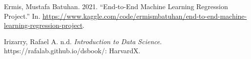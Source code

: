 \documentclass[
]{article}
\newlength{\cslhangindent}
\newenvironment{CSLReferences}[2] %
 {\begin{list}{}{%
  \setlength{\itemindent}{0pt}
  \setlength{\leftmargin}{0pt}
  \setlength{\parsep}{0pt}
  \ifodd #1
   \setlength{\leftmargin}{\cslhangindent}
   \setlength{\itemindent}{-1\cslhangindent}
  \fi
  \setlength{\itemsep}{#2\baselineskip}}}
 {\end{list}}
\begin{document}
\label{refs}
\begin{CSLReferences}{1}{0}
Ermis, Mustafa Batuhan. 2021. {``End-to-End Machine Learning Regression Project.''} In. \url{https://www.kaggle.com/code/ermismbatuhan/end-to-end-machine-learning-regression-project}.

Irizarry, Rafael A. n.d. \emph{Introduction to Data Science}. https://rafalab.github.io/dsbook/: HarvardX.

\end{CSLReferences}
\end{document}
